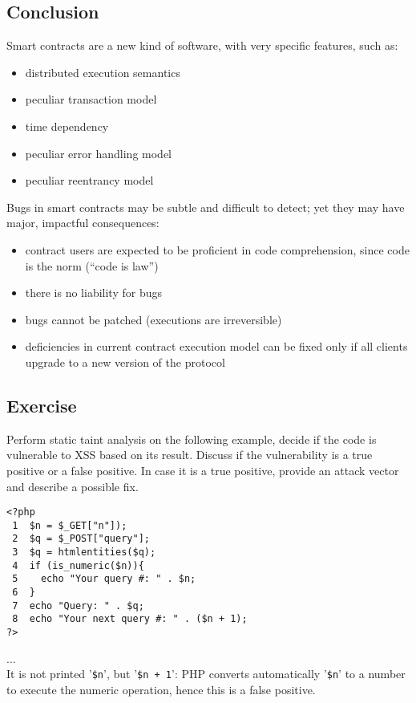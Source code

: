 \documentclass[a4paper, 10pt, titlepage]{article}
\begin{document}
\subsection{Conclusion}
Smart contracts are a new kind of software, with very specific features, such as:
\begin{itemize}
\item distributed execution semantics
\item peculiar transaction model
\item time dependency
\item peculiar error handling model
\item peculiar reentrancy model
\end{itemize}
Bugs in smart contracts may be subtle and difficult to detect; yet they may have major, impactful consequences:
\begin{itemize}
\item contract users are expected to be proficient in code comprehension, since code is the norm (“code is law”)
\item there is no liability for bugs
\item bugs cannot be patched (executions are irreversible)
\item deficiencies in current contract execution model can be fixed only if all clients upgrade to a new version of the protocol
\end{itemize}

\subsection*{Exercise}
Perform static taint analysis on the following example, decide if the code is vulnerable to XSS based on its result. Discuss if the vulnerability is a true positive or a false positive. In case it is a true positive, provide an attack vector and describe a possible fix.
\begin{small}
\begin{lstlisting}
<?php 
 1  $n = $_GET["n"]); 
 2  $q = $_POST["query"]; 
 3  $q = htmlentities($q);
 4  if (is_numeric($n)){
 5    echo "Your query #: " . $n; 
 6  }
 7  echo "Query: " . $q;
 8  echo "Your next query #: " . ($n + 1); 
?>
\end{lstlisting}
\end{small}
... \medskip\\
It is not printed '\lstinline|$n|', but '\lstinline|$n + 1|': PHP converts automatically '\lstinline|$n|' to a number to execute the numeric operation, hence this is a false positive.
	
\end{document}
